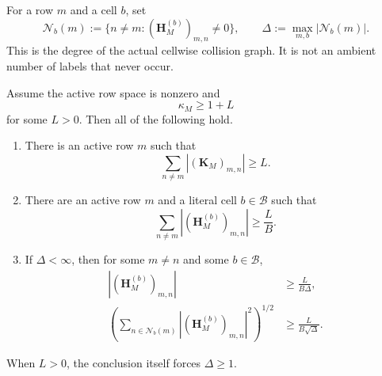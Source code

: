 For a row \(m\) and a cell \(b\), set
\begin{equation}
 \mathcal N_b(m)
 :=\{n\ne m:(\mathbf H_M^{(b)})_{m,n}\ne0\},
 \qquad
 \Delta:=\max_{m,b}|\mathcal N_b(m)|.
 \label{eq:tpc62-cell-neighbour-degree}
\end{equation}
This is the degree of the actual cellwise collision graph.  It is not an
ambient number of labels that never occur.

\begin{theorem}
\label{thm:tpc62-localized-alias-inverse}
Assume the active row space is nonzero and
\begin{equation}
 \kappa_M\ge 1+L
 \label{eq:tpc62-large-kappa-hypothesis}
\end{equation}
for some \(L>0\).  Then all of the following hold.
\begin{enumerate}[label=\textup{(\roman*)},leftmargin=3em]
 \item There is an active row \(m\) such that
 \begin{equation}
  \sum_{n\ne m}|(\mathbf K_M)_{m,n}|\ge L.
  \label{eq:tpc62-large-row-l1}
 \end{equation}
 \item There are an active row \(m\) and a literal cell
       \(b\in\mathscr B\) such that
 \begin{equation}
  \sum_{n\ne m}|(\mathbf H_M^{(b)})_{m,n}|
  \ge \frac{L}{B}.
  \label{eq:tpc62-large-cell-row-l1}
 \end{equation}
 \item If \(\Delta<\infty\), then for some \(m\ne n\) and some
       \(b\in\mathscr B\),
 \begin{align}
  |(\mathbf H_M^{(b)})_{m,n}|
  &\ge \frac{L}{B\Delta},
  \label{eq:tpc62-large-pair-witness}\\
  \left(\sum_{n\in\mathcal N_b(m)}
  |(\mathbf H_M^{(b)})_{m,n}|^2\right)^{1/2}
  &\ge \frac{L}{B\sqrt{\Delta}}.
  \label{eq:tpc62-large-l2-star}
 \end{align}
\end{enumerate}
When \(L>0\), the conclusion itself forces \(\Delta\ge1\).
\end{theorem}

